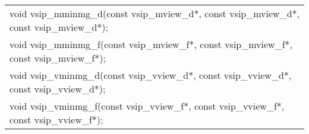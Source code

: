 \\\cvsiplh
\afh
{
\ttfamily
\\\hspace*{.04\textwidth}\begin{tabular}[H]{l}
void vsip\_mminmg\_d(const vsip\_mview\_d*, const vsip\_mview\_d*, const vsip\_mview\_d*);\\
void vsip\_mminmg\_f(const vsip\_mview\_f*, const vsip\_mview\_f*, const vsip\_mview\_f*);\\
void vsip\_vminmg\_d(const vsip\_vview\_d*, const vsip\_vview\_d*, const vsip\_vview\_d*);\\
void vsip\_vminmg\_f(const vsip\_vview\_f*, const vsip\_vview\_f*, const vsip\_vview\_f*);\\
\end{tabular}
}
\\\pyjvsiph
%
%
%

